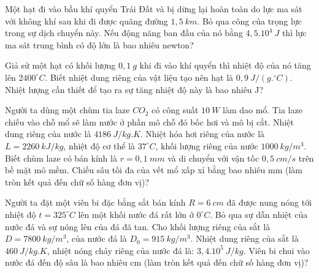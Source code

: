 \begin{ex}
	Một hạt đi vào bầu khí quyển Trái Đất và bị dừng lại hoàn toàn do lực ma sát với không khí sau khi đi được quãng đường $1,5\ km$. Bỏ qua công của trọng lực trong sự dịch chuyển này. Nếu động năng ban đầu của nó bằng $4,5.10^4\ J$ thì lực ma sát trung bình có độ lớn là bao nhiêu newton? 
\end{ex}
\begin{ex}
	Giả sử một hạt có khối lượng $0,1\ g$ khi đi vào khí quyển thì nhiệt độ của nó tăng lên $2400^{\circ}C$. Biết nhiệt dung riêng của vật liệu tạo nên hạt là $0,9\ J/(g.{}^{\circ} C)$. Nhiệt lượng cần thiết để tạo ra sự tăng nhiệt độ này là bao nhiêu J?
\end{ex}
\begin{ex}
	Người ta dùng một chùm tia laze $CO_2$ có công suất $10\ W$ làm dao mổ. Tia laze chiếu vào chỗ mổ sẽ làm nước ở phần mô chỗ đó bốc hơi và mô bị cắt. Nhiệt dung riêng của nước là $4186\  J/kg.K$. Nhiệt hóa hơi riêng của nước là $L=2260\  kJ/kg$, nhiệt độ cơ thể là $37^{\circ} C$, khối lượng riêng của nước $1000\  kg/m^3$. Biết chùm laze có bán kính là $r=0,1\  mm$ và di chuyển với vận tốc $0,5\  cm/s$ trên bề mặt mô mềm. Chiều sâu tối đa của vết mổ xấp xỉ bằng bao nhiêu mm (làm tròn kết quả đến chữ số hàng đơn vị)?
\end{ex}
\begin{ex}
	Người ta đặt một viên bi đặc bằng sắt bán kính $R=6\  cm$ đã được nung nóng tới nhiệt độ $t=325^{\circ} C$ lên một khối nước đá rất lớn ở $0^{\circ} C$. Bỏ qua sự dẫn nhiệt của nước đá và sự nóng lên của đá đã tan. Cho khối lượng riêng của sắt là $D=7800\  kg/m^3$, của nước đá là $D_0=915\  kg/m^3$. Nhiệt dung riêng của sắt là $460\  J/kg.K$, nhiệt nóng chảy riêng của nước đá là: $3,4.10^5\  J/kg$. Viên bi chui vào nước đá đến độ sâu là bao nhiêu cm (làm tròn kết quả đến chữ số hàng đơn vị)?
\end{ex}


